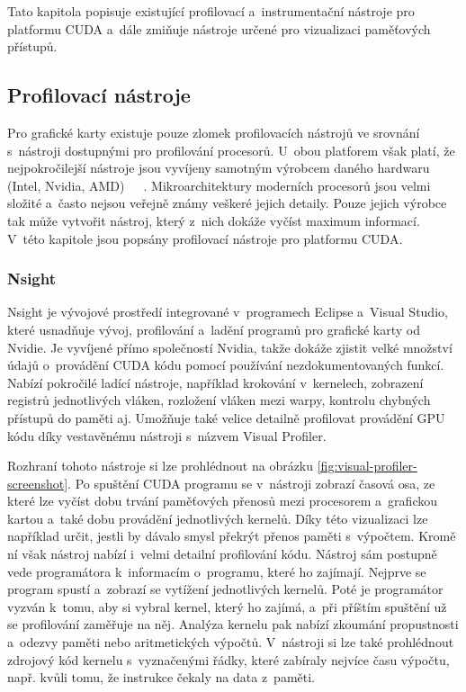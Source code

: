 Tato kapitola popisuje existující profilovací a~instrumentační nástroje pro platformu CUDA a~dále zmiňuje nástroje určené pro vizualizaci paměťových přístupů.

\subsection{Profilovací nástroje}
Pro grafické karty existuje pouze zlomek profilovacích nástrojů ve srovnání s~nástroji dostupnými pro profilování procesorů. U~obou platforem však platí, že nejpokročilejší nástroje jsou vyvíjeny samotným výrobcem daného hardwaru (Intel, Nvidia, AMD)~\cite{vtune}~\cite{nsight}~\cite{codexl}. Mikroarchitektury moderních procesorů jsou velmi složité a~často nejsou veřejně známy veškeré jejich detaily. Pouze jejich výrobce tak může vytvořit nástroj, který z~nich dokáže vyčíst maximum informací. V~této kapitole jsou popsány profilovací nástroje pro platformu CUDA.

\subsubsection{Nsight}
Nsight je vývojové prostředí integrované v~programech Eclipse a~Visual Studio, které usnadňuje vývoj, profilování a~ladění programů pro grafické karty od Nvidie. Je vyvíjené přímo společností Nvidia, takže dokáže zjistit velké množství údajů o~provádění CUDA kódu pomocí používání nezdokumentovaných funkcí. Nabízí pokročilé ladící nástroje, například krokování v~kernelech, zobrazení registrů jednotlivých vláken, rozložení vláken mezi warpy, kontrolu chybných přístupů do paměti aj. Umožňuje také velice detailně profilovat provádění GPU kódu díky vestavěnému nástroji s~názvem Visual Profiler.

Rozhraní tohoto nástroje si lze prohlédnout na obrázku \ref{fig:visual-profiler-screenshot}. Po spuštění CUDA programu se v~nástroji zobrazí časová osa, ze které lze vyčíst dobu trvání paměťových přenosů mezi procesorem a~grafickou kartou a~také dobu provádění jednotlivých kernelů. Díky této vizualizaci lze například určit, jestli by dávalo smysl překrýt přenos paměti s~výpočtem. Kromě ní však nástroj nabízí i~velmi detailní profilování kódu. Nástroj sám postupně vede programátora k~informacím o~programu, které ho zajímají. Nejprve se program spustí a~zobrazí se vytížení jednotlivých kernelů. Poté je programátor vyzván k~tomu, aby si vybral kernel, který ho zajímá, a~při příštím spuštění už se profilování zaměřuje na něj. Analýza kernelu pak nabízí zkoumání propustnosti a~odezvy paměti nebo aritmetických výpočtů. V~nástroji si lze také prohlédnout zdrojový kód kernelu s~vyznačenými řádky, které zabíraly nejvíce času výpočtu, např. kvůli tomu, že instrukce čekaly na data z~paměti.

